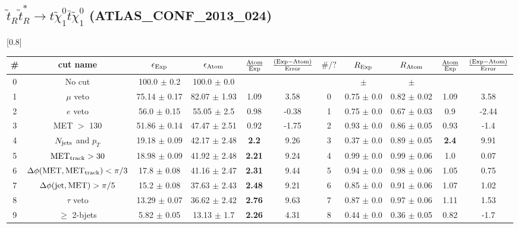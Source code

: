 \documentclass[12pt]{article}
\begin{document}
    
\subsection*{$\tilde t_R \tilde t_R^* \to t \tilde \chi_1^0 \bar t \tilde \chi_1^0$ (ATLAS\_CONF\_2013\_024)} 


\renewcommand{\arraystretch}{1.3}
\begin{table}[h!]
\begin{center}
\scalebox{0.7}[0.8]{ 
\begin{tabular}{c|c||c|c|>{\columncolor{yellow}}c|c||c|c|c|>{\columncolor{yellow}}c|c}
\hline
\# & cut name & $\epsilon_{\rm Exp}$ & $\epsilon_{\rm Atom}$ & $\frac{\rm Atom}{\rm Exp}$ & $\frac{({\rm Exp} - {\rm Atom})}{\rm Error}$ & $\#/?$ & $R_{\rm Exp}$ & $R_{\rm Atom}$ & $\frac{\rm Atom}{\rm Exp}$ & $\frac{({\rm Exp} - {\rm Atom})}{\rm Error}$ \\
\hline
0 & No cut & 100.0 $\pm$ 0.2 & 100.0 $\pm$ 0.0 &  &  &  &  $\pm$  &  $\pm$  &  &  \\
1 & $\mu$ veto & 75.14 $\pm$ 0.17 & 82.07 $\pm$ 1.93 & 1.09 & 3.58 & 0 & 0.75 $\pm$ 0.0 & 0.82 $\pm$ 0.02 & 1.09 & 3.58 \\
2 & $e$ veto & 56.0 $\pm$ 0.15 & 55.05 $\pm$ 2.5 & 0.98 & -0.38 & 1 & 0.75 $\pm$ 0.0 & 0.67 $\pm$ 0.03 & 0.9 & -2.44 \\
3 & MET $>$ 130 & 51.86 $\pm$ 0.14 & 47.47 $\pm$ 2.51 & 0.92 & -1.75 & 2 & 0.93 $\pm$ 0.0 & 0.86 $\pm$ 0.05 & 0.93 & -1.4 \\
4 & \cellcolor{magenta} $N_{\rm jets}$ and $p_T$ & 19.18 $\pm$ 0.09 & 42.17 $\pm$ 2.48 & \color{red}\bf 2.2 & 9.26 & 3 & 0.37 $\pm$ 0.0 & 0.89 $\pm$ 0.05 & \color{red}\bf 2.4 & 9.91 \\
5 & $\rm MET_{track} > 30$ & 18.98 $\pm$ 0.09 & 41.92 $\pm$ 2.48 & \color{red}\bf 2.21 & 9.24 & 4 & 0.99 $\pm$ 0.0 & 0.99 $\pm$ 0.06 & 1.0 & 0.07 \\
6 & $\Delta \phi (\rm MET, MET_{track}) < \pi/3$ & 17.8 $\pm$ 0.08 & 41.16 $\pm$ 2.47 & \color{red}\bf 2.31 & 9.44 & 5 & 0.94 $\pm$ 0.0 & 0.98 $\pm$ 0.06 & 1.05 & 0.75 \\
7 & $\Delta \phi (\rm jet, MET) > \pi/5$ & 15.2 $\pm$ 0.08 & 37.63 $\pm$ 2.43 & \color{red}\bf 2.48 & 9.21 & 6 & 0.85 $\pm$ 0.0 & 0.91 $\pm$ 0.06 & 1.07 & 1.02 \\
8 & $\tau$ veto & 13.29 $\pm$ 0.07 & 36.62 $\pm$ 2.42 & \color{red}\bf 2.76 & 9.63 & 7 & 0.87 $\pm$ 0.0 & 0.97 $\pm$ 0.06 & 1.11 & 1.53 \\
9 & $\ge$ 2-bjets & 5.82 $\pm$ 0.05 & 13.13 $\pm$ 1.7 & \color{red}\bf 2.26 & 4.31 & 8 & 0.44 $\pm$ 0.0 & 0.36 $\pm$ 0.05 & 0.82 & -1.7 \\

\end{tabular}}
\end{center}
\end{table}
\end{document}
